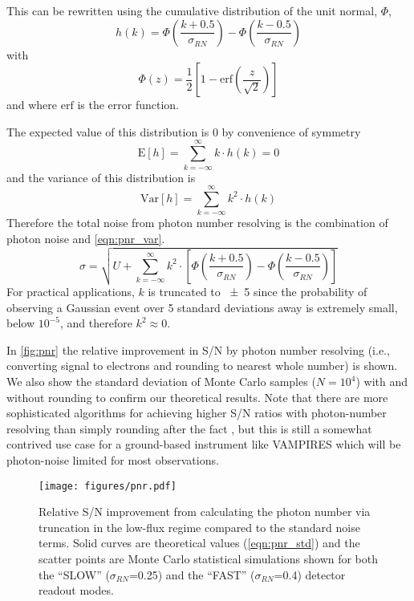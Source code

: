 This can be rewritten using the cumulative distribution of the unit normal, $\Phi$, 
\begin{equation}
    h(k) = \Phi\left(\frac{k + 0.5}{\sigma_{RN}} \right) - \Phi\left(\frac{k - 0.5}{\sigma_{RN}} \right)
\end{equation}
with
\begin{equation}
    \Phi(z) = \frac12 \left[1 - \mathrm{erf}\left(\frac{z}{\sqrt{2}}\right) \right]
\end{equation}
and where $\mathrm{erf}$ is the error function.

The expected value of this distribution is 0 by convenience of symmetry
\begin{equation}
    \mathrm{E}[h] = \sum_{k=-\infty}^{\infty}{ k \cdot h(k)} = 0
\end{equation}
and the variance of this distribution is
\begin{equation}
\label{eqn:pnr_var}
    \mathrm{Var}[h] = \sum_{k=-\infty}^{\infty}{ k^2\cdot h(k)}
\end{equation}
Therefore the total noise from photon number resolving is the combination of photon noise and \autoref{eqn:pnr_var}.
\begin{equation}
    \label{eqn:pnr_std}
    \sigma = \sqrt{U + \sum_{k=-\infty}^{\infty}{ k^2\cdot \left[\Phi\left(\frac{k + 0.5}{\sigma_{RN}} \right) - \Phi\left(\frac{k - 0.5}{\sigma_{RN}}\right)\right]}}
\end{equation}
For practical applications, $k$ is truncated to \num{\pm5} since the probability of observing a Gaussian event over 5 standard deviations away is extremely small, below $10^{-5}$, and therefore $k^2\approx0$.

In \autoref{fig:pnr} the relative improvement in S/N by photon number resolving (i.e., converting signal to electrons and rounding to nearest whole number) is shown. We also show the standard deviation of Monte Carlo samples ($N=10^4$) with and without rounding to confirm our theoretical results. Note that there are more sophisticated algorithms for achieving higher S/N ratios with photon-number resolving than simply rounding after the fact \citep{harpsoe_bayesian_2012}, but this is still a somewhat contrived use case for a ground-based instrument like VAMPIRES which will be photon-noise limited for most observations.

\begin{figure}
    \centering
    \texttt{[image: figures/pnr.pdf]}
    \caption{Relative S/N improvement from calculating the photon number via truncation in the low-flux regime compared to the standard noise terms. Solid curves are theoretical values (\autoref{eqn:pnr_std}) and the scatter points are Monte Carlo statistical simulations shown for both the ``SLOW'' ($\sigma_{RN}$=\SI{0.25}{\electron}) and the ``FAST''  ($\sigma_{RN}$=\SI{0.4}{\electron})  detector readout modes.\label{fig:pnr}}
\end{figure}
